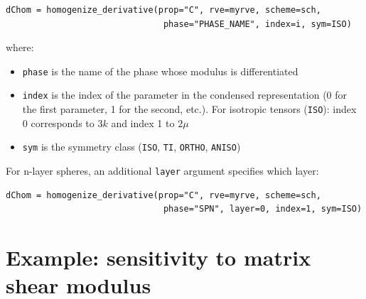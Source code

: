 \documentclass[
  a4paper,
  numbers=noendperiod,
  DIV=12]{scrreprt}
\providecommand{\tightlist}{%
  \setlength{\itemsep}{0pt}\setlength{\parskip}{0pt}}
\begin{document}
\begin{verbatim}
dChom = homogenize_derivative(prop="C", rve=myrve, scheme=sch,
                               phase="PHASE_NAME", index=i, sym=ISO)
\end{verbatim}

where:

\begin{itemize}
\tightlist
\item
  \texttt{phase} is the name of the phase whose modulus is
  differentiated
\item
  \texttt{index} is the index of the parameter in the condensed
  representation (0 for the first parameter, 1 for the second, etc.).
  For isotropic tensors (\texttt{ISO}): index 0 corresponds to \(3k\)
  and index 1 to \(2\mu\)
\item
  \texttt{sym} is the symmetry class (\texttt{ISO}, \texttt{TI},
  \texttt{ORTHO}, \texttt{ANISO})
\end{itemize}

For n-layer spheres, an additional \texttt{layer} argument specifies
which layer:

\begin{verbatim}
dChom = homogenize_derivative(prop="C", rve=myrve, scheme=sch,
                               phase="SPN", layer=0, index=1, sym=ISO)
\end{verbatim}

\section{Example: sensitivity to matrix shear
modulus}\label{example-sensitivity-to-matrix-shear-modulus}
\end{document}
